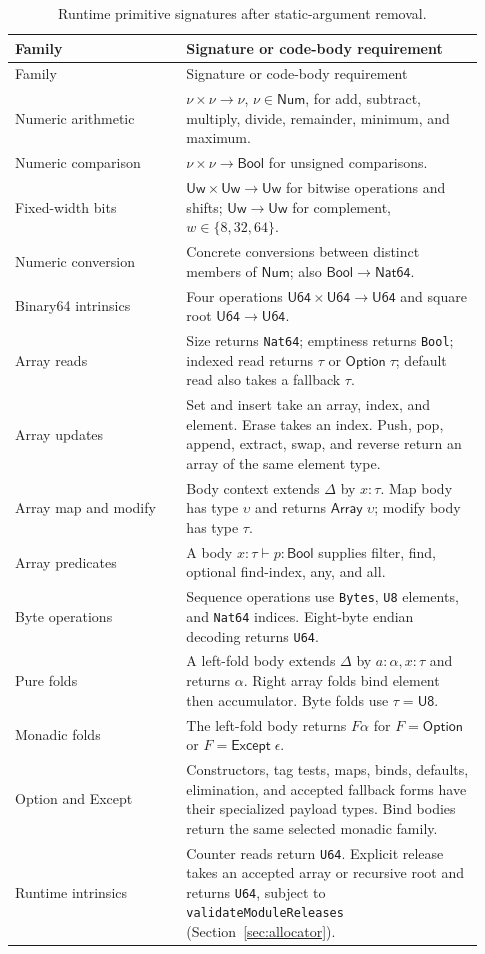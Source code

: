 \documentclass[11pt]{article}
\newcommand{\code}[1]{\texttt{#1}}
\newcommand{\ty}[1]{\mathsf{#1}}
\begin{document}
\begin{longtable}{L{0.34\linewidth}L{0.59\linewidth}}
\caption{Runtime primitive signatures after static-argument removal.}\label{tab:primitives}\\
\toprule Family & Signature or code-body requirement\\\midrule\endfirsthead
\toprule Family & Signature or code-body requirement\\\midrule\endhead
Numeric arithmetic & $\nu\times\nu\to\nu$, $\nu\in\ty{Num}$, for add, subtract, multiply, divide, remainder, minimum, and maximum.\\
Numeric comparison & $\nu\times\nu\to\ty{Bool}$ for unsigned comparisons.\\
Fixed-width bits & $\ty{Uw}\times\ty{Uw}\to\ty{Uw}$ for bitwise operations and shifts; $\ty{Uw}\to\ty{Uw}$ for complement, $w\in\{8,32,64\}$.\\
Numeric conversion & Concrete conversions between distinct members of $\ty{Num}$; also $\ty{Bool}\to\ty{Nat64}$.\\
Binary64 intrinsics & Four operations $\ty{U64}\times\ty{U64}\to\ty{U64}$ and square root $\ty{U64}\to\ty{U64}$.\\
Array reads & Size returns \code{Nat64}; emptiness returns \code{Bool}; indexed read returns $\tau$ or $\ty{Option}\;\tau$; default read also takes a fallback $\tau$.\\
Array updates & Set and insert take an array, index, and element.  Erase takes an index.  Push, pop, append, extract, swap, and reverse return an array of the same element type.\\
Array map and modify & Body context extends $\Delta$ by $x:\tau$.  Map body has type $\upsilon$ and returns $\ty{Array}\;\upsilon$; modify body has type $\tau$.\\
Array predicates & A body $x:\tau\vdash p:\ty{Bool}$ supplies filter, find, optional find-index, any, and all.\\
Byte operations & Sequence operations use \code{Bytes}, \code{U8} elements, and \code{Nat64} indices.  Eight-byte endian decoding returns \code{U64}.\\
Pure folds & A left-fold body extends $\Delta$ by $a:\alpha,x:\tau$ and returns $\alpha$.  Right array folds bind element then accumulator.  Byte folds use $\tau=\ty{U8}$.\\
Monadic folds & The left-fold body returns $F\alpha$ for $F=\ty{Option}$ or $F=\ty{Except}\;\epsilon$.\\
Option and Except & Constructors, tag tests, maps, binds, defaults, elimination, and accepted fallback forms have their specialized payload types.  Bind bodies return the same selected monadic family.\\
Runtime intrinsics & Counter reads return \code{U64}.  Explicit release takes an accepted array or recursive root and returns \code{U64}, subject to \code{validateModuleReleases} (Section~\ref{sec:allocator}).\\
\bottomrule
\end{longtable}
\end{document}
